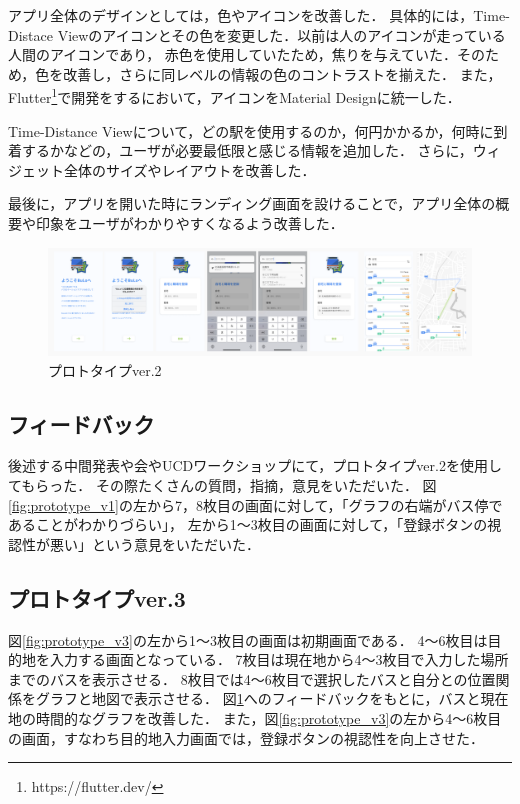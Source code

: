 アプリ全体のデザインとしては，色やアイコンを改善した．
具体的には，Time-Distace Viewのアイコンとその色を変更した．以前は人のアイコンが走っている人間のアイコンであり，
赤色を使用していたため，焦りを与えていた．そのため，色を改善し，さらに同レベルの情報の色のコントラストを揃えた．
また，Flutter\footnote{https://flutter.dev/}で開発をするにおいて，アイコンをMaterial Designに統一した．

Time-Distance Viewについて，どの駅を使用するのか，何円かかるか，何時に到着するかなどの，ユーザが必要最低限と感じる情報を追加した．
さらに，ウィジェット全体のサイズやレイアウトを改善した．

最後に，アプリを開いた時にランディング画面を設けることで，アプリ全体の概要や印象をユーザがわかりやすくなるよう改善した．

\begin{figure}[H]
    \centering
    \includegraphics[width=12cm]{images/prototype_v3.png}
    \caption{プロトタイプver.2}
    \label{fig:prototype_v2}
\end{figure}

\subsection{フィードバック}
後述する中間発表や会やUCDワークショップにて，プロトタイプver.2を使用してもらった．
その際たくさんの質問，指摘，意見をいただいた．
図\ref{fig:prototype_v1}の左から7，8枚目の画面に対して，「グラフの右端がバス停であることがわかりづらい」，
左から1〜3枚目の画面に対して，「登録ボタンの視認性が悪い」という意見をいただいた．

\subsection{プロトタイプver.3}
図\ref{fig:prototype_v3}の左から1〜3枚目の画面は初期画面である．
4〜6枚目は目的地を入力する画面となっている．
7枚目は現在地から4〜3枚目で入力した場所までのバスを表示させる．
8枚目では4〜6枚目で選択したバスと自分との位置関係をグラフと地図で表示させる．
図\ref{fig:prototype_v2}へのフィードバックをもとに，バスと現在地の時間的なグラフを改善した．
また，図\ref{fig:prototype_v3}の左から4〜6枚目の画面，すなわち目的地入力画面では，登録ボタンの視認性を向上させた．

